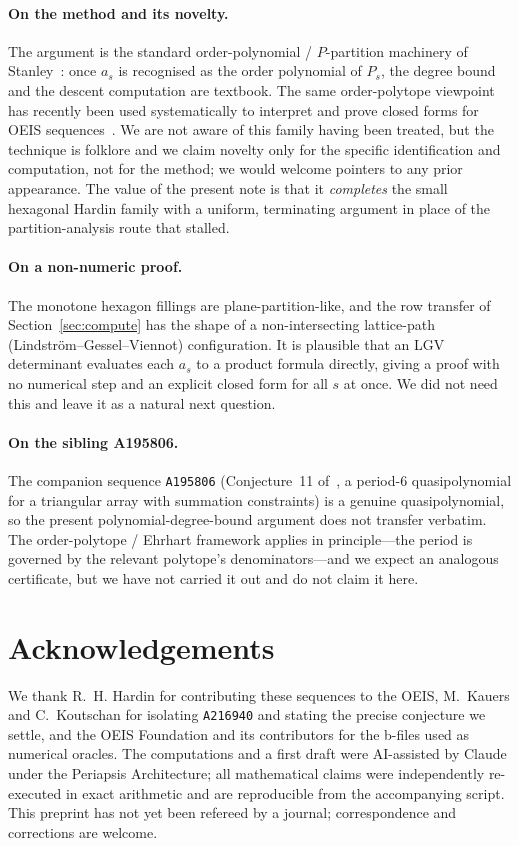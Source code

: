 \documentclass[11pt]{article}
\theoremstyle{plain}
\theoremstyle{definition}
\theoremstyle{remark}
\newcommand{\OEIS}[1]{\texttt{#1}}
\begin{document}
\paragraph{On the method and its novelty.} The argument is the standard order-polynomial /
$P$-partition machinery of Stanley~\cite{EC1}: once $a_s$ is recognised as the order polynomial of
$P_s$, the degree bound and the descent computation are textbook. The same order-polytope viewpoint
has recently been used systematically to interpret and prove closed forms for OEIS
sequences~\cite{EOP24}. We are not aware of this family having been treated, but the technique is
folklore and we claim novelty only for the specific identification and computation, not for the
method; we would welcome pointers to any prior appearance. The value of the present note is that it
\emph{completes} the small hexagonal Hardin family with a uniform, terminating argument in place of
the partition-analysis route that stalled.

\paragraph{On a non-numeric proof.} The monotone hexagon fillings are plane-partition-like, and the
row transfer of Section~\ref{sec:compute} has the shape of a non-intersecting lattice-path
(Lindstr\"om--Gessel--Viennot) configuration. It is plausible that an LGV determinant evaluates each
$a_s$ to a product formula directly, giving a proof with no numerical step and an explicit closed
form for all $s$ at once. We did not need this and leave it as a natural next question.

\paragraph{On the sibling A195806.} The companion sequence \OEIS{A195806} (Conjecture~11
of~\cite{KK23}, a period-$6$ quasipolynomial for a triangular array with summation constraints) is a
genuine quasipolynomial, so the present polynomial-degree-bound argument does not transfer verbatim.
The order-polytope / Ehrhart framework applies in principle---the period is governed by the relevant
polytope's denominators---and we expect an analogous certificate, but we have not carried it out and
do not claim it here.

\section*{Acknowledgements}
We thank R.~H. Hardin for contributing these sequences to the OEIS, M.~Kauers and C.~Koutschan for
isolating \OEIS{A216940} and stating the precise conjecture we settle, and the OEIS Foundation and
its contributors for the b-files used as numerical oracles. The computations and a first draft were
AI-assisted by Claude under the Periapsis Architecture; all mathematical claims were independently
re-executed in exact arithmetic and are reproducible from the accompanying script. This preprint has
not yet been refereed by a journal; correspondence and corrections are welcome.
\end{document}
